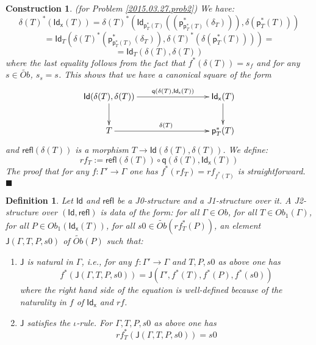 \documentclass[12pt]{article}
\numberwithin{equation}{section}
\newenvironment{eq}{\begin{equation}}{\end{equation}}
\newtheorem{definition}[proposition]{Definition}
\newtheorem{construction0}[proposition]{Construction}
\newenvironment{construction}[1]{\begin{construction0}(for Problem \ref{#1})}{$\blacksquare$ \end{construction0}}
\newcommand{\llabel}[1]{\label{#1}}
\newcommand{\sr}{\rightarrow}
\newcommand{\wt}{\widetilde}
\newcommand{\p}{\mathsf{p}}
\newcommand{\q}{\mathsf{q}}
\newcommand{\Id}{\mathsf{Id}} %
\newcommand{\refl}{\mathsf{refl}}
\newcommand{\J}{\mathsf{J}}
\newcommand{\Idx}{\mathsf{Id_x}} %
\begin{document}
\begin{construction}{2015.03.27.prob2}
\llabel{2015.03.27.constr2}\rm We have:
%
$$\delta(T)^*(\Idx(T))=\delta(T)^*(\Id_{\p_T^*(T)}((\p_{\p_T^*(T)}^*(\delta_T))),\delta(\p_T^*(T)))$$
$$=\Id_T(\delta(T)^*(\p_{\p_T^*(T)}^*(\delta_T)),\delta(T)^*(\delta(\p_T^*(T))))=$$
$$=\Id_T(\delta(T),\delta(T))$$
%
where the last equality follows from the fact that $f^*(\delta(T))=s_f$ and for
any $s\in\wt{Ob}$, $s_s=s$.  This shows that we have a canonical square of the
form
%
\begin{eq}
\llabel{2015.03.31.eq3}
\begin{xy}
          \xymatrix@C=7pc{ \Id(\delta(T),\delta(T))
            \ar[r]^-{\q(\delta(T),\Idx(T))} \ar[d] & \Idx(T) \ar[d]\\ T
            \ar[r]^{\delta(T)} & \p_T^*(T) }
       \end{xy}
\end{eq}
%
and $\refl(\delta(T))$ is a morphism $T\sr \Id(\delta(T),\delta(T))$. We define:
%
\begin{eq}
\llabel{2015.04.02.eq1} rf_T:=\refl(\delta(T))\circ \q(\delta(T),\Idx(T))
\end{eq}
%
The proof that for any $f:\Gamma'\sr \Gamma$ one has $f^*(rf_T)=rf_{f^*(T)}$ is
straightforward.
\end{construction}
%
\begin{definition}
\llabel{2015.03.27.def3} Let $\Id$ and $\refl$ be a J0-structure and a
J1-structure over it. A J2-structure over $(\Id,\refl)$ is data of the form: for
all $\Gamma\in Ob$, for all $T\in Ob_1(\Gamma)$, for all $P\in Ob_1(\Idx(T))$,
for all $s0\in \wt{Ob}(rf_T^*(P))$, an element $\J(\Gamma,T,P,s0)$ of
$\wt{Ob}(P)$ such that:
%
\begin{enumerate}
\item $\J$ is natural in $\Gamma$, i.e., for any $f:\Gamma'\sr \Gamma$ and
  $T,P,s0$ as above one has
%
$$f^*(\J(\Gamma,T,P,s0))=\J(\Gamma',f^*(T),f^*(P),f^*(s0))$$
%
where the right hand side of the equation is well-defined because of the
naturality in $f$ of $\Idx$ and $rf$.
\item $\J$ satisfies the $\iota$-rule. For $\Gamma, T, P, s0$ as above one has
%
$$rf_T^*(\J(\Gamma,T,P,s0))=s0$$
%
\end{enumerate}
\end{definition}
%
\end{document}
